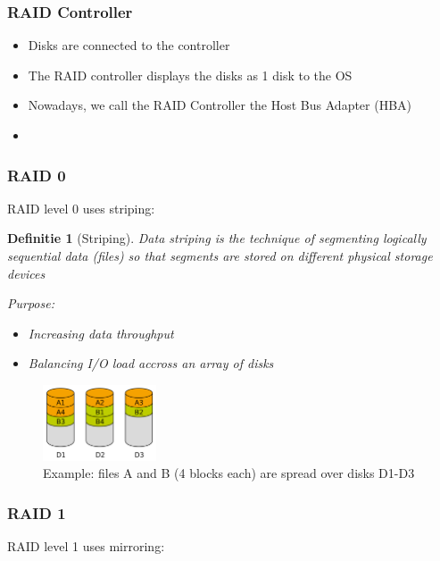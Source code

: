 \documentclass{article}
\newtheorem{theorem}{Definitie}[section]
\begin{document}
\subsubsection{RAID Controller}

\begin{itemize}
    \item Disks are connected to the controller
    \item The RAID controller displays the disks as 1 disk to the OS
    \item Nowadays, we call the RAID Controller the Host Bus Adapter (HBA)
    \item 
\end{itemize}

\subsubsection{RAID 0}

RAID level 0 uses striping:

\begin{theorem}[Striping]
    Data striping is the technique of segmenting logically sequential data (files) so that segments are stored on different physical storage devices

    Purpose:

    \begin{itemize}
        \item Increasing data throughput
        \item Balancing I/O load accross an array of disks
    \end{itemize}
\end{theorem}

\begin{figure}[H]
    \centering
    \includegraphics[width=0.3\textwidth]{raid-striping.png}
    \caption{Example: files A and B (4 blocks each) are spread over disks D1-D3}
\end{figure}


\subsubsection{RAID 1}

RAID level 1 uses mirroring:
\end{document}
